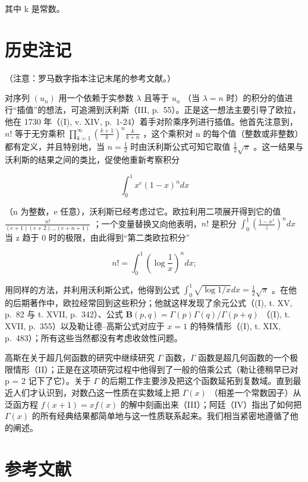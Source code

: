 其中 k 是常数。

\section*{历史注记}
{}

（注意：罗马数字指本注记末尾的参考文献。）

对序列 \((u_{n})\) 用一个依赖于实参数 \(\lambda\) 且等于 \(u_{n}\) （当 \(\lambda = n\) 时）的积分的值进行``插值''的想法，可追溯到沃利斯（III, p.~55）。正是这一想法主要引导了欧拉，他在 1730 年（(I), v. XIV, p.~1-24）着手对阶乘序列进行插值。他首先注意到，\(n!\) 等于无穷乘积 \(\prod_{k=1}^{\infty}\left(\frac{k+1}{k}\right)^{n}\frac{k}{k+n}\) ，这个乘积对 n 的每个值（整数或非整数）都有定义，并且特别地，当 \(n = \frac{1}{2}\) 时由沃利斯公式可知它取值 \(\frac{1}{2}\sqrt{\pi}\) 。这一结果与沃利斯的结果之间的类比，促使他重新考察积分

\[
\int_ {0} ^ {1} x ^ {e} (1 - x) ^ {n} d x
\]

（n 为整数，e 任意），沃利斯已经考虑过它。欧拉利用二项展开得到它的值 \(\frac{n!}{(e+1)(e+2)\ldots(e+n+1)}\) ；一个变量替换又向他表明，\(n!\) 是积分 \(\int_{0}^{1}\left(\frac{1-x^{z}}{z}\right)^{n}dx\) 当 z 趋于 0 时的极限，由此得到``第二类欧拉积分''

\[
n! = \int_ {0} ^ {1} \left(\log \frac {1}{x}\right) ^ {n} d x;
\]

用同样的方法，并利用沃利斯公式，他得到公式 \(\int_0^1\sqrt{\log 1 / x} dx = \frac{1}{2}\sqrt{\pi}\) 。在他的后期著作中，欧拉经常回到这些积分；他就这样发现了余元公式（(I), t. XV, p.~82 与 t. XVII, p.~342）、公式 \(\mathbf{B}(p,q) = \Gamma (p)\Gamma (q) / \Gamma (p + q)\) （(I), t. XVII, p.~355）以及勒让德–高斯公式对应于 \(x = 1\) 的特殊情形（(I), t. XIX, p.~483）；所有这些当然都没有考虑收敛性问题。

高斯在关于超几何函数的研究中继续研究 \(\Gamma\) 函数，\(\Gamma\) 函数是超几何函数的一个极限情形（II）；正是在这项研究过程中他得到了一般的倍乘公式（勒让德稍早已对 p = 2 记下了它）。关于 \(\Gamma\) 的后期工作主要涉及把这个函数延拓到复数域。直到最近人们才认识到，对数凸这一性质在实数域上把 \(\Gamma(x)\) （相差一个常数因子）从泛函方程 \(f(x + 1) = x f(x)\) 的解中刻画出来（III）；阿廷（IV）指出了如何把 \(\Gamma(x)\) 的所有经典结果都简单地与这一性质联系起来。我们相当紧密地遵循了他的阐述。

\section*{参考文献}
{}

